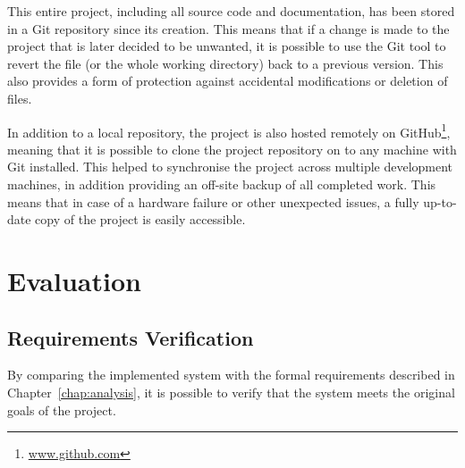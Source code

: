 \documentclass[11pt,a4paper]{report}
\begin{document}
This entire project, including all source code and documentation, has been stored in a Git repository since its creation. This means that if a change is made to the project that is later decided to be unwanted, it is possible to use the Git tool to revert the file (or the whole working directory) back to a previous version. This also provides a form of protection against accidental modifications or deletion of files.

In addition to a local repository, the project is also hosted remotely on GitHub\footnote{\url{www.github.com}}, meaning that it is possible to clone the project repository on to any machine with Git installed. This helped to synchronise the project across multiple development machines, in addition providing an off-site backup of all completed work. This means that in case of a hardware failure or other unexpected issues, a fully up-to-date copy of the project is easily accessible.

\pagebreak

\chapter{Evaluation}
\label{chap:evaluation}

\section{Requirements Verification}
By comparing the implemented system with the formal requirements described in Chapter~\ref{chap:analysis}, it is possible to verify that the system meets the original goals of the project.
\end{document}
